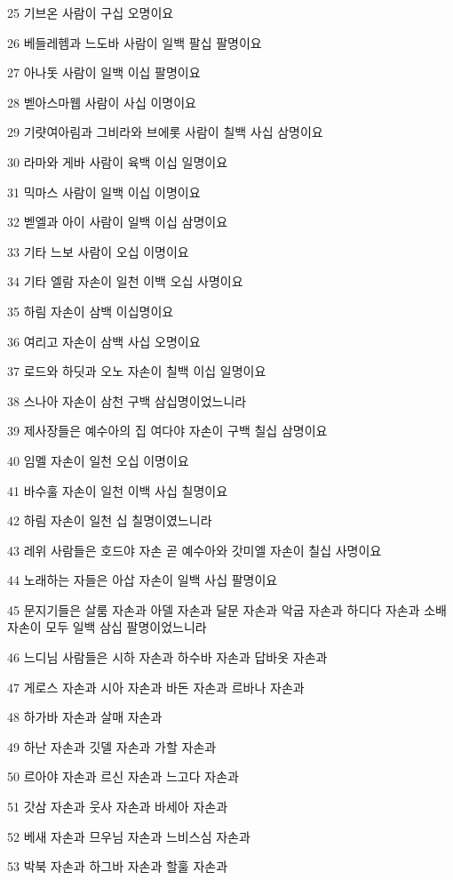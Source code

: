 \par 25 기브온 사람이 구십 오명이요
\par 26 베들레헴과 느도바 사람이 일백 팔십 팔명이요
\par 27 아나돗 사람이 일백 이십 팔명이요
\par 28 벧아스마웹 사람이 사십 이명이요
\par 29 기럇여아림과 그비라와 브에롯 사람이 칠백 사십 삼명이요
\par 30 라마와 게바 사람이 육백 이십 일명이요
\par 31 믹마스 사람이 일백 이십 이명이요
\par 32 벧엘과 아이 사람이 일백 이십 삼명이요
\par 33 기타 느보 사람이 오십 이명이요
\par 34 기타 엘람 자손이 일천 이백 오십 사명이요
\par 35 하림 자손이 삼백 이십명이요
\par 36 여리고 자손이 삼백 사십 오명이요
\par 37 로드와 하딧과 오노 자손이 칠백 이십 일명이요
\par 38 스나아 자손이 삼천 구백 삼십명이었느니라
\par 39 제사장들은 예수아의 집 여다야 자손이 구백 칠십 삼명이요
\par 40 임멜 자손이 일천 오십 이명이요
\par 41 바수훌 자손이 일천 이백 사십 칠명이요
\par 42 하림 자손이 일천 십 칠명이였느니라
\par 43 레위 사람들은 호드야 자손 곧 예수아와 갓미엘 자손이 칠십 사명이요
\par 44 노래하는 자들은 아삽 자손이 일백 사십 팔명이요
\par 45 문지기들은 살룸 자손과 아델 자손과 달문 자손과 악굽 자손과 하디다 자손과 소배 자손이 모두 일백 삼십 팔명이었느니라
\par 46 느디님 사람들은 시하 자손과 하수바 자손과 답바옷 자손과
\par 47 게로스 자손과 시아 자손과 바돈 자손과 르바나 자손과
\par 48 하가바 자손과 살매 자손과
\par 49 하난 자손과 깃델 자손과 가할 자손과
\par 50 르아야 자손과 르신 자손과 느고다 자손과
\par 51 갓삼 자손과 웃사 자손과 바세아 자손과
\par 52 베새 자손과 므우님 자손과 느비스심 자손과
\par 53 박북 자손과 하그바 자손과 할훌 자손과
